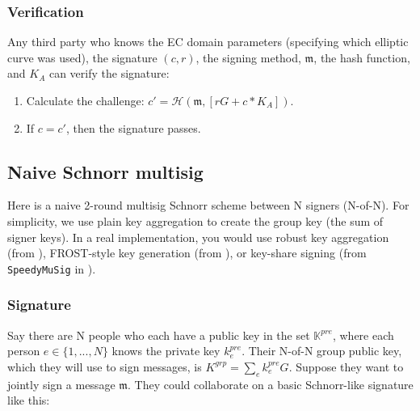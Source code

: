 \subsubsection*{Verification}

Any third party who knows the EC domain parameters (specifying which elliptic curve was used), the signature $(c, r)$, the signing method, $\mathfrak{m}$, the hash function, and $K_A$ can verify the signature:

\begin{enumerate}
	\item Calculate the challenge: \(c' = \mathcal{H}(\mathfrak{m},[r G + c*K_A])\).

	\item If $c = c'$, then the signature passes.
\end{enumerate}


\subsection*{Naive Schnorr multisig}

Here is a naive 2-round multisig Schnorr scheme between N signers (N-of-N). For simplicity, we use plain key aggregation to create the group key (the sum of signer keys). In a real implementation, you would use robust key aggregation (from \cite{maxwell2018simple-musig}), FROST-style key generation (from \cite{FROST-multisig-scheme, MRL-0009-multisig}), or key-share signing (from {\tt SpeedyMuSig} in \cite{multisig-proofs-and-optimizations}).

\subsubsection*{Signature}

Say there are N people who each have a public key in the set $\mathbb{K}^{pre}$, where each person $e \in \{1,...,N\}$ knows the private key $k^{pre}_e$. Their N-of-N group public key, which they will use to sign messages, is $K^{grp} = \sum_e k^{pre}_e G$. Suppose they want to jointly sign a message $\mathfrak{m}$. They could collaborate on a basic Schnorr-like signature like this:

